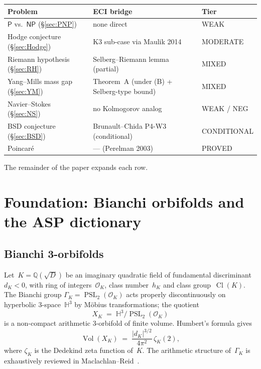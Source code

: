 \documentclass[11pt,a4paper]{article}
\theoremstyle{definition}
\DeclareMathOperator{\PSL}{PSL}
\DeclareMathOperator{\Cl}{Cl}
\DeclareMathOperator{\Vol}{Vol}
\newcommand{\OK}{\mathcal{O}_K}
\newcommand{\HH}{\mathbb{H}}
\newcommand{\QQ}{\mathbb{Q}}
\begin{document}
\begin{center}
\begin{tabular}{lll}
\toprule
\textbf{Problem} & \textbf{ECI bridge} & \textbf{Tier} \\
\midrule
$\mathsf{P}$ vs.\ $\mathsf{NP}$ (\S\ref{sec:PNP}) & none direct & WEAK \\
Hodge conjecture (\S\ref{sec:Hodge}) & K3 sub-case via Maulik 2014 & MODERATE \\
Riemann hypothesis (\S\ref{sec:RH}) & Selberg--Riemann lemma (partial) & MIXED \\
Yang--Mills mass gap (\S\ref{sec:YM}) & Theorem~A (under (B) + Selberg-type bound) & MIXED \\
Navier--Stokes (\S\ref{sec:NS}) & no Kolmogorov analog & WEAK / NEG \\
BSD conjecture (\S\ref{sec:BSD}) & Brunault--Chida P4-W3 (conditional) & CONDITIONAL \\
Poincar\'e & --- (Perelman 2003) & PROVED \\
\bottomrule
\end{tabular}
\end{center}

The remainder of the paper expands each row.

\section{Foundation: Bianchi orbifolds and the ASP dictionary}
\label{sec:foundation}

\subsection{Bianchi 3-orbifolds}
Let~$K=\QQ(\sqrt{D})$ be an imaginary quadratic field of fundamental
discriminant~$d_{K}<0$, with ring of integers~$\OK$, class
number~$h_{K}$ and class group~$\Cl(K)$. The Bianchi group
$\Gamma_{K}=\PSL_{2}(\OK)$ acts properly discontinuously on hyperbolic
3-space~$\HH^{3}$ by Möbius transformations; the quotient
\[
X_{K} \;=\; \HH^{3}/\PSL_{2}(\OK)
\]
is a non-compact arithmetic 3-orbifold of finite volume. Humbert's
formula \cite{Humbert1919} gives
\begin{equation}
\Vol(X_{K}) \;=\; \frac{|d_{K}|^{3/2}}{4\pi^{2}}\,
\zeta_{K}(2),
\label{eq:humbert}
\end{equation}
where $\zeta_{K}$ is the Dedekind zeta function of~$K$. The arithmetic
structure of~$\Gamma_{K}$ is exhaustively reviewed in
Maclachlan--Reid~\cite{MaclachlanReid2003}.
\end{document}
